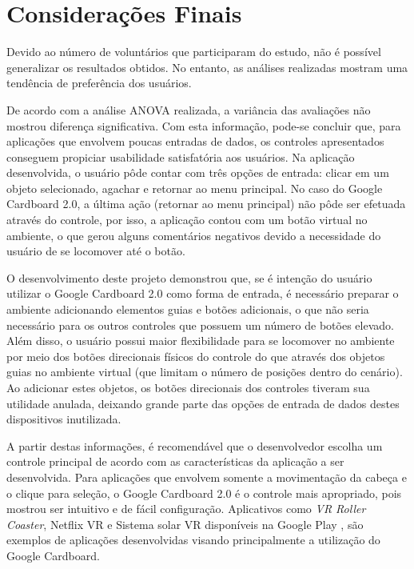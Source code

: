 \chapter{Considerações Finais}
\label{c.conclusao}

Devido ao número de voluntários que participaram do estudo, não é possível generalizar os resultados obtidos. No entanto, as análises realizadas mostram uma tendência de preferência dos usuários. 

De acordo com a análise ANOVA realizada, a variância das avaliações não mostrou diferença significativa. Com esta informação, pode-se concluir que, para aplicações que envolvem poucas entradas de dados, os controles apresentados conseguem propiciar usabilidade satisfatória aos usuários. Na aplicação desenvolvida, o usuário pôde contar com três opções de entrada: clicar em um objeto selecionado, agachar e retornar ao menu principal. No caso do Google Cardboard 2.0, a última ação (retornar ao menu principal) não pôde ser efetuada através do controle, por isso, a aplicação contou com um botão virtual no ambiente, o que gerou alguns comentários negativos devido a necessidade do usuário de se locomover até o botão. 

O desenvolvimento deste projeto demonstrou que, se é intenção do usuário utilizar o Google Cardboard 2.0 como forma de entrada, é necessário preparar o ambiente adicionando elementos guias e botões adicionais, o que não seria necessário para os outros controles que possuem um número de botões elevado. Além disso, o usuário possui maior flexibilidade para se locomover no ambiente por meio dos botões direcionais físicos do controle do que através dos objetos guias no ambiente virtual (que limitam o número de posições dentro do cenário). Ao adicionar estes objetos, os botões direcionais dos controles tiveram sua utilidade anulada, deixando grande parte das opções de entrada de dados destes dispositivos inutilizada.

A partir destas informações, é recomendável que o desenvolvedor escolha um controle principal de acordo com as características da aplicação a ser desenvolvida. Para aplicações que envolvem somente a movimentação da cabeça e o clique para seleção, o Google Cardboard 2.0 é o controle mais apropriado, pois mostrou ser intuitivo e de fácil configuração. Aplicativos como \textit{VR Roller Coaster}, Netflix VR e Sistema solar VR disponíveis na Google Play \cite{googleplay}, são exemplos de aplicações desenvolvidas visando principalmente a utilização do Google Cardboard.

